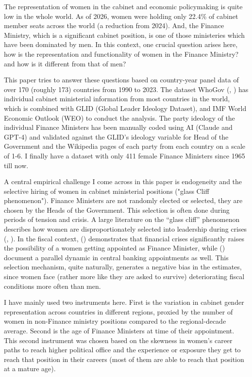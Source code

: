 \documentclass[12pt]{article}
\renewcommand{\citet}[1]{\textit{\citeauthor{#1}} (\citeyear{#1})}
\renewcommand{\citep}[1]{(\textit{\citeauthor{#1}}, \citeyear{#1})}
\begin{document}
The representation of women in the cabinet and economic policymaking is quite low in the whole world. As of 2026, women were holding only 22.4\% of cabinet member seats across the world (a reduction from 2024). And, the Finance Ministry, which is a significant cabinet position, is one of those ministeries which have been dominated by men. In  this context, one crucial question arises here, how is the representation and functionality of women in the Finance Ministry? and how is it different from that of men?

This paper tries to answer these questions based on country-year panel data of over 170 (roughly 173) countries from 1990 to 2023. The dataset WhoGov \citep{nyrup2020} has individual cabinet ministerial information from most countries in the world, which is combined with GLID (Global Leader Ideology Dataset), and IMF World Economic Outlook (WEO) to conduct the analysis. The party ideology of the individual Finance Ministers has been manually coded using AI (Claude and GPT-4) and validated against the GLID's ideology variable for Head of the Government and the Wikipedia pages of each party from each country on a scale of 1-6. I finally have a dataset with only 411 female Finance Ministers since 1965 till now.  


A central empirical challenge I come across in this paper is endogeneity and the selective hiring of women in cabinet ministerial positions ("glass Cliff phenomenon"). Finance Ministers are not randomly elected or selected, they are chosen by the Heads of the Government. This selection is often done during periods of tension and crisis. A large literature on the ``glass cliff'' phenomenon describes how women are disproportionately selected into leadership during crises \citep{ryan2005,armstrong2024}. In the fiscal context, \citet{armstrong2024} demonstrates that financial crises significantly raises the possibility of a women getting appointed as Finance Minister, while \citet{kern2025} document a parallel dynamic in central banking appointments as well. This selection mechanism, quite naturally, generates a negative bias in the estimates, since women face (rather more like they are asked to survive) deteriorating fiscal conditions more often than men.

I have mainly used two instruments here. First is the variation in cabinet gender representation across countries in different regions, proxied by the number of women in non-Finance ministry positions compared to the regional-decade average. Second is the age of Finance Ministers at time of their appointment. This second instrument was chosen based on the skewness in women’s career paths to reach higher political office and the experience or exposure they get to reach that position in their careers (most of them are able to reach that position at a mature age). 
\end{document}
